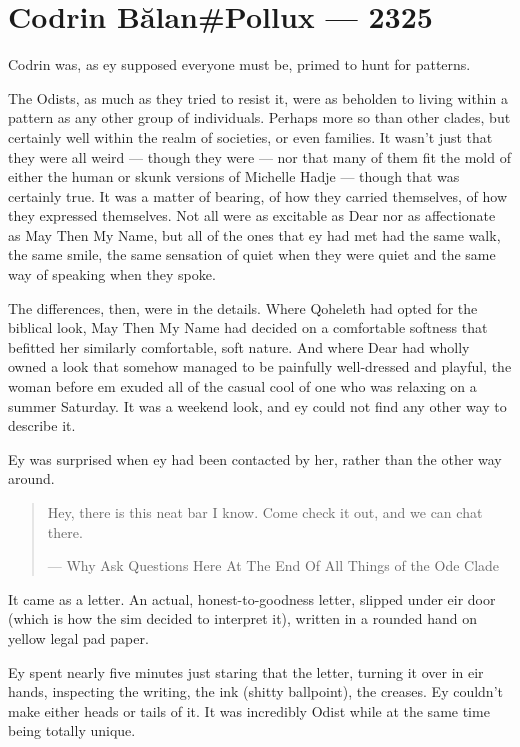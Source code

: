 \hypertarget{codrin-bux103lanpollux-2325}{%
\chapter{Codrin Bălan\#Pollux — 2325}\label{codrin-bux103lanpollux-2325}}

Codrin was, as ey supposed everyone must be, primed to hunt for patterns.

The Odists, as much as they tried to resist it, were as beholden to living within a pattern as any other group of individuals. Perhaps more so than other clades, but certainly well within the realm of societies, or even families. It wasn't just that they were all weird — though they were — nor that many of them fit the mold of either the human or skunk versions of Michelle Hadje — though that was certainly true. It was a matter of bearing, of how they carried themselves, of how they expressed themselves. Not all were as excitable as Dear nor as affectionate as May Then My Name, but all of the ones that ey had met had the same walk, the same smile, the same sensation of quiet when they were quiet and the same way of speaking when they spoke.

The differences, then, were in the details. Where Qoheleth had opted for the biblical look, May Then My Name had decided on a comfortable softness that befitted her similarly comfortable, soft nature. And where Dear had wholly owned a look that somehow managed to be painfully well-dressed and playful, the woman before em exuded all of the casual cool of one who was relaxing on a summer Saturday. It was a weekend look, and ey could not find any other way to describe it.

Ey was surprised when ey had been contacted by her, rather than the other way around.

\begin{quote}
Hey, there is this neat bar I know. Come check it out, and we can chat there.

— Why Ask Questions Here At The End Of All Things of the Ode Clade
\end{quote}

It came as a letter. An actual, honest-to-goodness letter, slipped under eir door (which is how the sim decided to interpret it), written in a rounded hand on yellow legal pad paper.

Ey spent nearly five minutes just staring that the letter, turning it over in eir hands, inspecting the writing, the ink (shitty ballpoint), the creases. Ey couldn't make either heads or tails of it. It was incredibly Odist while at the same time being totally unique.

